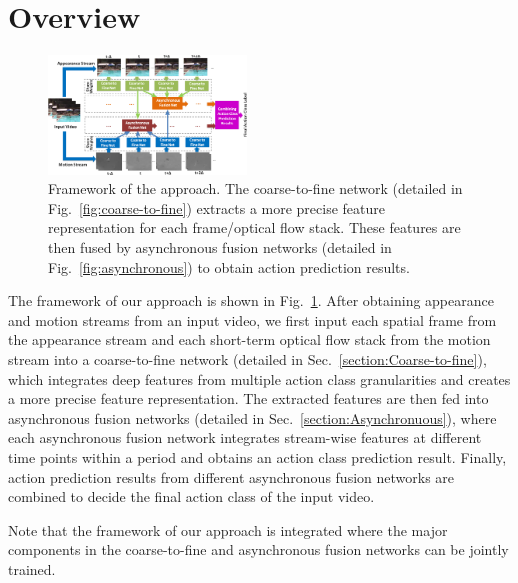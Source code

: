 \documentclass[letterpaper]{article} %
\begin{document}
\section{Overview}
\label{section:overview}

\begin{figure}
  \centering
  \includegraphics[width=0.47\textwidth,height=0.30\textwidth]{./figures1/framework.png}
  \caption{Framework of the approach. The coarse-to-fine network (detailed in Fig.~\ref{fig:coarse-to-fine}) extracts a more precise feature representation for each frame/optical flow stack. These features are then fused by asynchronous fusion networks (detailed in Fig.~\ref{fig:asynchronous}) to obtain action prediction results.}
    \label{fig:framework}
\end{figure}

The framework of our approach is shown in Fig.~\ref{fig:framework}. After obtaining appearance and motion streams from an input video, we first input each spatial frame from the appearance stream and each short-term optical flow stack from the motion stream into a coarse-to-fine network (detailed in Sec.~\ref{section:Coarse-to-fine}), which integrates deep features from multiple action class granularities and creates a more precise feature representation. The extracted features are then fed into asynchronous fusion networks (detailed in Sec.~\ref{section:Asynchronuous}), where each asynchronous fusion network integrates stream-wise features at different time points within a period and obtains an action class prediction result. Finally, action prediction results from different asynchronous fusion networks are combined to decide the final action class of the input video.

Note that the framework of our approach is integrated where the major components in the coarse-to-fine and asynchronous fusion networks can be jointly trained.%

\end{document}
